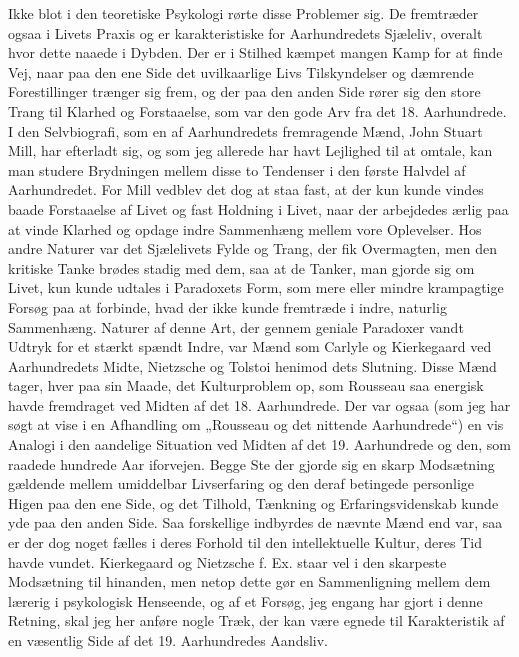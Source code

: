 \documentclass[12pt,a4paper,openany]{book}
\newcommand{\opage}[1]{\marginnote{\footnotesize\textit{[#1]}}}
\begin{document}
Ikke blot i den teoretiske Psykologi rørte disse Problemer sig. De
fremtræder ogsaa i Livets Praxis og er karakteristiske for Aarhundredets
Sjæleliv, overalt hvor dette naaede i Dybden. Der er i Stilhed
kæmpet mangen Kamp for at finde Vej, naar paa den ene Side det
uvilkaarlige Livs Tilskyndelser og dæmrende Forestillinger trænger
sig frem, og der paa den anden Side rører sig den store Trang til
Klarhed og Forstaaelse, som var den gode Arv fra det 18. Aarhundrede.
I den Selvbiografi, som en af Aarhundredets fremragende
Mænd, John Stuart Mill, har efterladt sig, og som jeg allerede har
havt Lejlighed til at omtale, kan man studere Brydningen mellem
disse to Tendenser i den første Halvdel af Aarhundredet. For Mill
vedblev det dog at staa fast, at der kun kunde vindes baade Forstaaelse
af Livet og fast Holdning i Livet, naar der arbejdedes ærlig
paa at vinde Klarhed og opdage indre Sammenhæng mellem vore
Oplevelser. Hos andre Naturer var det Sjælelivets Fylde og Trang,
der fik Overmagten, men den kritiske Tanke brødes stadig med
dem, saa at de Tanker, man gjorde sig om Livet, kun kunde udtales
i Paradoxets Form, som mere eller mindre krampagtige Forsøg
paa at forbinde, hvad der ikke kunde fremtræde i indre, naturlig
Sammenhæng. Naturer af denne Art, der gennem geniale Paradoxer
vandt Udtryk for et stærkt spændt Indre, var Mænd som Carlyle
og Kierkegaard ved Aarhundredets Midte, Nietzsche og Tolstoi
henimod dets Slutning. Disse Mænd tager, hver paa sin Maade, det
Kulturproblem op, som Rousseau saa energisk havde fremdraget
ved Midten af det 18. Aarhundrede. Der var ogsaa (som jeg har søgt
at vise i en Afhandling om „Rousseau og det nittende Aarhundrede“)
en vis Analogi i den aandelige Situation ved Midten af det 19. Aarhundrede
og den, som raadede hundrede Aar iforvejen. Begge Ste%
\opage{52}der gjorde sig en skarp Modsætning gældende mellem umiddelbar
Livserfaring og den deraf betingede personlige Higen paa den ene
Side, og det Tilhold, Tænkning og Erfaringsvidenskab kunde yde
paa den anden Side. Saa forskellige indbyrdes de nævnte Mænd end
var, saa er der dog noget fælles i deres Forhold til den intellektuelle
Kultur, deres Tid havde vundet. Kierkegaard og Nietzsche f. Ex.
staar vel i den skarpeste Modsætning til hinanden, men netop dette
gør en Sammenligning mellem dem lærerig i psykologisk Henseende,
og af et Forsøg, jeg engang har gjort i denne Retning, skal jeg her
anføre nogle Træk, der kan være egnede til Karakteristik af en væsentlig
Side af det 19. Aarhundredes Aandsliv.
\end{document}
